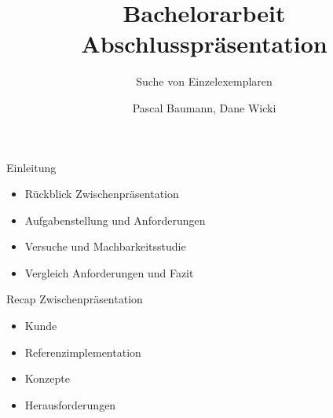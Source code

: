 \documentclass{beamer}
\title{Bachelorarbeit\\ Abschlusspräsentation}
\subtitle{Suche von Einzelexemplaren}
\author{Pascal Baumann, Dane Wicki}
\begin{document}
\begin{frame}[plain]
    \maketitle
\end{frame}
\begin{frame}{Einleitung}
\begin{itemize}
    \item Rückblick Zwischenpräsentation
    \item Aufgabenstellung und Anforderungen
    \item Versuche und Machbarkeitsstudie
    \item Vergleich Anforderungen und Fazit
\end{itemize}
\end{frame}
\begin{frame}{Recap Zwischenpräsentation}
\begin{itemize}
    \item Kunde
    \item Referenzimplementation
    \item Konzepte
    \item Herausforderungen
\end{itemize}
\end{frame}
\end{document}
